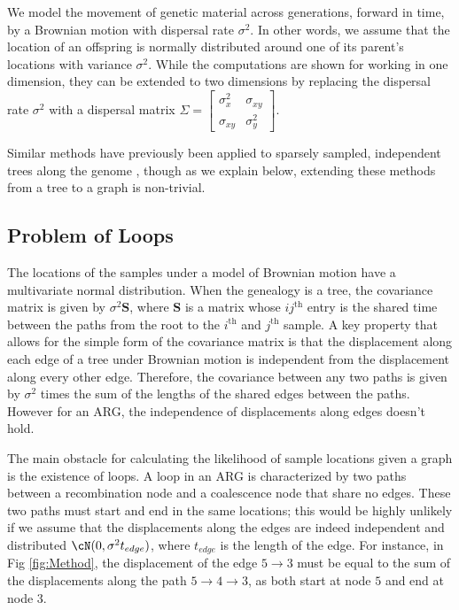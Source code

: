 We model the movement of genetic material across generations, forward in time, by a Brownian motion with dispersal rate $\sigma^2$. In other words, we assume that the location of an offspring is normally distributed around one of its parent's locations with variance $\sigma^2$. While the computations are shown for working in one dimension, they can be extended to two dimensions by replacing the dispersal rate $\sigma^2$ with a dispersal matrix $\Sigma = \begin{bmatrix} 
    \sigma_x^2 & \sigma_{xy} \\
    \sigma_{xy} & \sigma_y^2
\end{bmatrix}$.

Similar methods have previously been applied to sparsely sampled, independent trees along the genome \citep{Osmond2021}, though as we explain below, extending these methods from a tree to a graph is non-trivial.

\subsection{Problem of Loops}

The locations of the samples under a model of Brownian motion have a multivariate normal distribution. When the genealogy is a tree, the covariance matrix is given by $\sigma^2 \mathbf{S}$, where $\mathbf{S}$ is a matrix whose $ij^{\text{th}}$ entry is the shared time between the paths from the root to the $i^{\text{th}}$ and $j^{\text{th}}$ sample. A key property that allows for the simple form of the covariance matrix is that the displacement along each edge of a tree under Brownian motion is independent from the displacement along every other edge. Therefore, the covariance between any two paths is given by $\sigma^2$ times the sum of the lengths of the shared edges between the paths. However for an ARG, the independence of displacements along edges doesn't hold. 

The main obstacle for calculating the likelihood of sample locations given a graph is the existence of loops. A loop in an ARG is characterized by two paths between a recombination node and a coalescence node that share no edges. These two paths must start and end in the same locations; this would be highly unlikely if we assume that the displacements along the edges are indeed independent and distributed $\cN(0,\sigma^2 t_{edge})$, where $t_{edge}$ is the length of the edge. For instance, in Fig \ref{fig:Method}, the displacement of the edge $5\rightarrow3$ must be equal to the sum of the displacements along the path $5 \rightarrow 4 \rightarrow 3$, as both start at node $5$ and end at node $3$.

